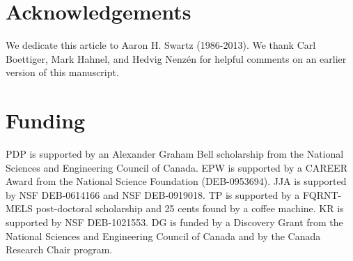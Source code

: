 \documentclass[letterpaper]{article}
\begin{document}
\section{Acknowledgements}

We dedicate this article to Aaron H. Swartz (1986-2013).  We thank Carl
Boettiger, Mark Hahnel, and Hedvig Nenz\'en for helpful comments on an earlier
version of this manuscript.

\section{Funding}

PDP is supported by an Alexander Graham Bell scholarship from the National
Sciences and Engineering Council of Canada. EPW is supported by a CAREER Award
from the National Science Foundation (DEB-0953694). JJA is supported by NSF
DEB-0614166 and NSF DEB-0919018.  TP is supported by a FQRNT-MELS post-doctoral
scholarship and 25 cents found by a coffee machine.  KR is supported by NSF
DEB-1021553. DG is funded by a Discovery Grant from the National Sciences and
Engineering Council of Canada and by the Canada Research Chair program.



\end{document}
